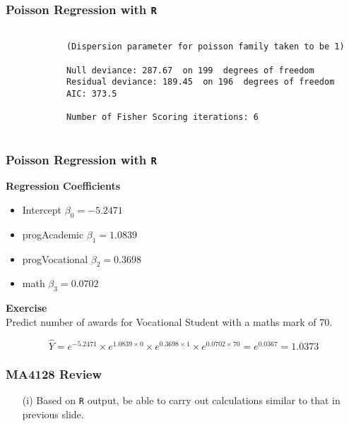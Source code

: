 \documentclass[MASTER.tex]{subfiles}
\begin{document}
\begin{frame}[fragile]
		\frametitle{Poisson Regression with \texttt{R}}


			\begin{verbatim}
			
			(Dispersion parameter for poisson family taken to be 1)
			
			Null deviance: 287.67  on 199  degrees of freedom
			Residual deviance: 189.45  on 196  degrees of freedom
			AIC: 373.5
			
			Number of Fisher Scoring iterations: 6
			
			\end{verbatim}
	
\end{frame}
\begin{frame}
\frametitle{Poisson Regression with \texttt{R}}
\noindent \textbf{Regression Coefficients}
\begin{itemize}
	\item        Intercept    $\beta_0 = -5.2471$
	\item			progAcademic $\beta_1 =    1.0839   $
	\item			progVocational  $\beta_2 =  0.3698  $
	\item			math           $\beta_3 =   0.0702 $
\end{itemize}

\noindent \textbf{Exercise}\\
Predict number of awards for Vocational Student with a maths mark of 70.

\[\hat{Y} = e^{-5.2471} \times e^{1.0839 \times 0}\times e^{0.3698 \times 1}\times e^{0.0702 \times 70} =e^{0.0367} = 1.0373\]



\end{frame}
\begin{frame}
	\frametitle{MA4128 Review}
	\large
	\begin{itemize}
		\item[(i)] Based on \texttt{R} output, be able to carry out calculations similar to that in previous slide.
	\end{itemize}
\end{frame}
\end{document}

